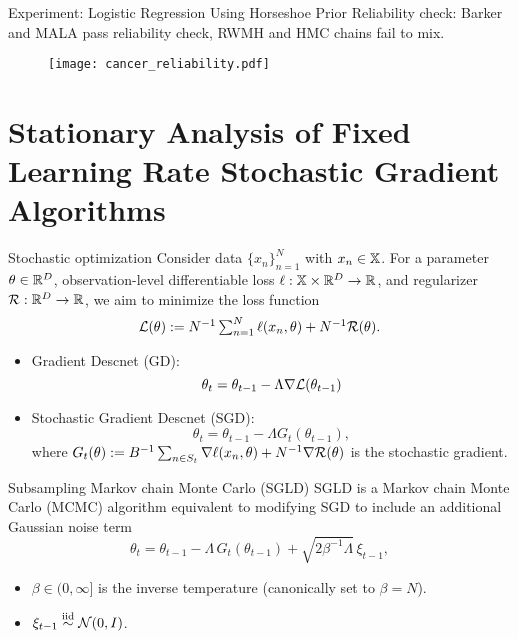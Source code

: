 \documentclass[10pt,xcolor=table]{beamer}
\begin{document}
\begin{frame}{Experiment: Logistic Regression Using Horseshoe Prior}
Reliability check: Barker and MALA pass reliability check, RWMH and HMC chains fail to mix. 
\begin{figure}
  \centering
  \texttt{[image: cancer\_reliability.pdf]}
\end{figure} 
\end{frame}


\section{Stationary Analysis of Fixed Learning Rate Stochastic Gradient Algorithms}
\begin{frame}{Stochastic optimization}
Consider data $\{x_{n}\}_{n=1}^{N}$ with $x_{n} \in \mathbb{X}$. 
For a parameter $\theta \in \mathbb{R}^{D}$, observation-level differentiable loss 
$\ell : \mathbb{X} \times \mathbb{R}^{D} \to \mathbb{R}$, and regularizer $\mathcal{R} : \mathbb{R}^{D} \to \mathbb{R}$, 
we aim to minimize the loss function
\begin{equation*}
\textstyle \mathcal{L}(\theta) := N^{-1} \sum_{n=1}^{N} \ell(x_{n}, \theta) + N^{-1}\mathcal{R}(\theta). 
\label{eq:loss function}
\end{equation*}
\begin{itemize}
    \item Gradient Descnet (GD): $$\textstyle\theta_{t} = \theta_{t-1} - \Lambda \nabla \textstyle \mathcal{L}(\theta_{t-1})$$
    \item Stochastic Gradient Descnet (SGD): 
\begin{equation*}
\textstyle\theta_{t} = \theta_{t-1} - \Lambda G_{t}(\theta_{t-1}),
\label{eq: sgd update}
\end{equation*}
where $G_{t}(\theta) := B^{-1} \sum_{n \in S_{t}} \nabla \ell(x_{n}, \theta) + N^{-1} \nabla \mathcal{R}(\theta)$ is the stochastic gradient.
\end{itemize}
\end{frame}

\begin{frame}{Subsampling Markov chain Monte Carlo (SGLD)}
SGLD is a Markov chain Monte Carlo (MCMC) algorithm equivalent to modifying SGD to include an additional Gaussian noise term
\begin{equation*}
\theta_{t} = \theta_{t-1} - \Lambda\,G_{t}(\theta_{t-1}) + \sqrt{2\beta^{-1} \Lambda}\,\xi_{t-1},
\label{eq: general SGLD update rule}
\end{equation*}
\begin{itemize}
    \item $\beta \in (0, \infty]$ is the inverse temperature (canonically set to $\beta = N$).
    \item $\xi_{t-1} \overset{\text{iid}}{\sim} \mathcal{N}(0, I)$.
\end{itemize}
\end{frame}
\end{document}
